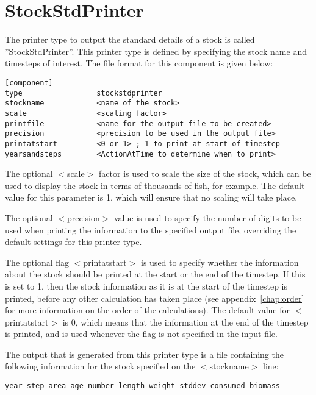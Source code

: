 \documentclass[10pt,twoside]{book}
\begin{document}
\newpage %
\section{StockStdPrinter}\label{sec:stockstdprinter}
The printer type to output the standard details of a stock is called ''StockStdPrinter''.  This printer type is defined by specifying the stock name and timesteps of interest.  The file format for this component is given below:

{\small\begin{verbatim}
[component]
type                 stockstdprinter
stockname            <name of the stock>
scale                <scaling factor>
printfile            <name for the output file to be created>
precision            <precision to be used in the output file>
printatstart         <0 or 1> ; 1 to print at start of timestep
yearsandsteps        <ActionAtTime to determine when to print>
\end{verbatim}}

The optional $<$scale$>$ factor is used to scale the size of the stock, which can be used to display the stock in terms of thousands of fish, for example.  The default value for this parameter is 1, which will ensure that no scaling will take place.

\bigskip
The optional $<$precision$>$ value is used to specify the number of digits to be used when printing the information to the specified output file, overriding the default settings for this printer type.

\bigskip
The optional flag $<$printatstart$>$ is used to specify whether the information about the stock should be printed at the start or the end of the timestep.  If this is set to 1, then the stock information as it is at the start of the timestep is printed, before any other calculation has taken place (see appendix~\ref{chap:order} for more information on the order of the calculations).  The default value for $<$printatstart$>$ is 0, which means that the information at the end of the timestep is printed, and is used whenever the flag is not specified in the input file.

\bigskip
The output that is generated from this printer type is a file containing the following information for the stock specified on the $<$stockname$>$ line:

{\small\begin{verbatim}
year-step-area-age-number-length-weight-stddev-consumed-biomass
\end{verbatim}}
\end{document}
